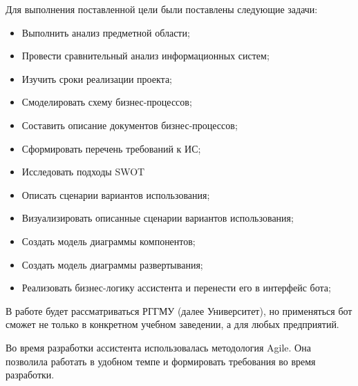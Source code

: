 Для выполнения поставленной цели были поставлены следующие задачи:
\begin{itemize}
    \item Выполнить анализ предметной области;
    \item Провести сравнительный анализ информационных систем;
    \item Изучить сроки реализации проекта;
    \item Смоделировать схему бизнес-процессов;
    \item Составить описание документов бизнес-процессов;
    \item Сформировать перечень требований к ИС;
    \item Исследовать подходы SWOT
    \item Описать сценарии вариантов использования;
    \item Визуализировать описанные сценарии вариантов использования;
    \item Создать модель диаграммы компонентов;
    \item Создать модель диаграммы развертывания;
    \item Реализовать бизнес-логику ассистента и перенести его в интерфейс бота;
\end{itemize}

В работе будет рассматриваться РГГМУ (далее Университет), но применяться бот
сможет не только в конкретном учебном заведении, а для любых предприятий.

Во время разработки ассистента использовалась методология Agile. Она позволила
работать в удобном темпе и формировать требования во время разработки.








